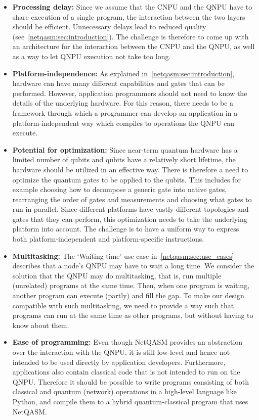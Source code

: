 \begin{itemize}
      \item \textbf{Processing delay:}
            Since we assume that the \ac{CNPU} and the \ac{QNPU} have to share execution of a single program, the interaction between the two layers should be efficient.
            Unnecessary delays lead to reduced quality (see~\cref{netqasm:sec:introduction}).
            The challenge is therefore to come up with an architecture for the interaction between the \ac{CNPU} and the \ac{QNPU}, as well as a way to let \ac{QNPU} execution not take too long.
      \item \textbf{Platform-independence:}
            As explained in~\cref{netqasm:sec:introduction}, hardware can have many different capabilities and gates that can be performed.
            However, application programmers should not need to know the details of the underlying hardware.
            For this reason, there needs to be a framework through which a programmer can develop an application in a platform-independent way which compiles to operations the \ac{QNPU} can execute.
      \item \textbf{Potential for optimization:}
            Since near-term quantum hardware has a limited number of qubits and qubits have a relatively short lifetime, the hardware should be utilized in an effective way.
            There is therefore a need to optimize the quantum gates to be applied to the qubits.
            This includes for example choosing how to decompose a generic gate into native gates, rearranging the order of gates and measurements and choosing what gates to run in parallel.
            Since different platforms have vastly different topologies and gates that they can perform, this optimization needs to take the underlying platform into account.
            The challenge is to have a uniform way to express both platform-independent and platform-specific instructions.
      \item \textbf{Multitasking:}
            The `Waiting time' use-case in~\cref{netqasm:sec:use_cases} describes that a node's \ac{QNPU} may have to wait a long time. We consider the solution that the \ac{QNPU} may do multitasking, that is, run multiple (unrelated) programs at the same time.
            Then, when one program is waiting, another program can execute (partly) and fill the gap.
            To make our design compatible with such multitasking, we need to provide a way such that programs can run at the same time as other programs, but without having to know about them.
      \item \textbf{Ease of programming:}
            Even though \ac{NetQASM} provides an abstraction over the interaction with the \ac{QNPU}, it is still low-level and hence not intended to be used directly by application developers.
            Furthermore, applications also contain classical code that is not intended to run on the \ac{QNPU}.
            Therefore it should be possible to write programs consisting of both classical and quantum (network) operations in a high-level language like Python, and compile them to a hybrid quantum-classical program that uses \ac{NetQASM}.

\end{itemize}